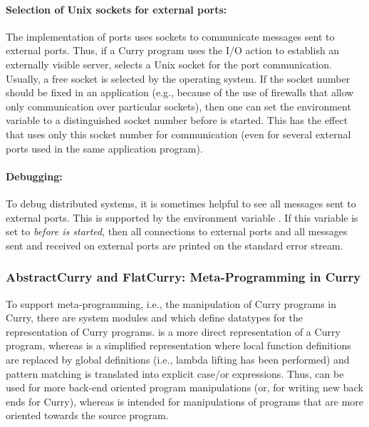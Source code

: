 {\paragraph{Selection of Unix sockets for external ports:}
The implementation of ports uses sockets to communicate
messages sent to external ports.
Thus, if a Curry program uses the
I/O action 
to establish an externally visible server,
\CYS selects a Unix socket for the port communication.
Usually, a free socket is selected by the operating system.
If the socket number should be fixed in an application (e.g.,
because of the use of firewalls that allow only
communication over particular sockets), then one
can set the environment variable 
to a distinguished socket number before \CYS is started.
This has the effect that \CYS uses only this socket
number for communication (even for several external ports
used in the same application program).

\paragraph{Debugging:}
To debug distributed systems,
it is sometimes helpful to see all messages sent to external ports.
This is supported by the environment variable
.
If this variable is set to 
\emph{before \CYS is started}, then all
connections to external ports and all
messages sent and received on external ports are
printed on the standard error stream.


\subsubsection{AbstractCurry and FlatCurry: Meta-Programming in Curry}
\label{sec-flatcurry}

To support meta-programming, i.e., the manipulation of Curry programs
in Curry, there are system modules 
and 
which define datatypes for the representation
of Curry programs.
 is a more direct representation of a Curry program,
whereas  is a simplified representation
where local function definitions are replaced by global definitions
(i.e., lambda lifting has been performed) and pattern matching
is translated into explicit case/or expressions.
Thus,  can be used for more back-end oriented
program manipulations (or, for writing new back ends for Curry),
whereas  is intended for manipulations of
programs that are more oriented towards the source program.

}
